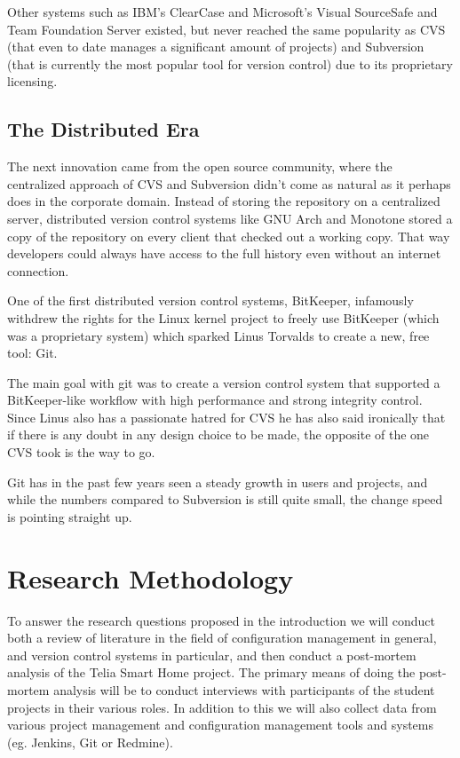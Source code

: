 \documentclass{llncs}
\begin{document}
Other systems such as IBM's ClearCase and Microsoft's Visual
SourceSafe and Team Foundation Server existed, but never reached the
same popularity as CVS (that even to date manages a significant amount
of projects) and Subversion (that is currently the most popular tool
for version control) due to its proprietary licensing.

\subsection{The Distributed Era}

The next innovation came from the open source community, where the
centralized approach of CVS and Subversion didn't come as natural as
it perhaps does in the corporate domain. Instead of storing the
repository on a centralized server, distributed version control
systems like GNU Arch and Monotone stored a copy of the repository on
every client that checked out a working copy. That way developers
could always have access to the full history even without an internet
connection. 

One of the first distributed version control systems, BitKeeper,
infamously withdrew the rights for the Linux kernel project to freely
use BitKeeper\cite{robert06}\cite{shaikh02} (which was a proprietary
system) which sparked Linus Torvalds to create a new, free tool: Git.

The main goal with git was to create a version control system that
supported a BitKeeper-like workflow with high performance and strong
integrity control. Since Linus also has a passionate hatred for CVS he
has also said ironically that if there is any doubt in any design
choice to be made, the opposite of the one CVS took is the way to
go\cite{torvalds07}.

Git has in the past few years seen a steady growth in users and
projects, and while the numbers compared to Subversion is still quite
small, the change speed is pointing straight up\cite{bird09}.

\section{Research Methodology}

To answer the research questions proposed in the introduction we will
conduct both a review of literature in the field of configuration
management in general, and version control systems in particular, and
then conduct a post-mortem analysis of the Telia Smart Home
project. The primary means of doing the post-mortem analysis will be
to conduct interviews with participants of the student projects in their
various roles. In addition to this we will also collect data from
various project management and configuration management tools and
systems (eg. Jenkins, Git or Redmine).
\end{document}
